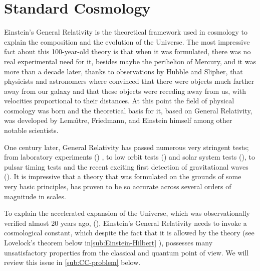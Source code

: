 
\chapter{Standard Cosmology \label{Overview}} %



\newcommand{\keyword}[1]{\textbf{#1}}
\newcommand{\tabhead}[1]{\textbf{#1}}
\newcommand{\code}[1]{\texttt{#1}}
\newcommand{\file}[1]{\texttt{\bfseries#1}}
\newcommand{\option}[1]{\texttt{\itshape#1}}

%

Einstein's General Relativity is the theoretical framework used in cosmology to explain the
composition and the evolution of the Universe.
The most impressive fact about this 100-year-old theory is that
when it was formulated, there was no real experimental need for it, besides maybe the
perihelion of Mercury, and it was more than a decade later, thanks to observations
by Hubble and Slipher, that physicists and astronomers where convinced that there were objects much farther away from
our galaxy and that these objects were receding away from us, with velocities proportional
to their distances. At this point the field of physical cosmology was born and the theoretical basis for it,
based on General Relativity, was developed by Lema\^{\i}tre, Friedmann, and Einstein himself among other
notable scientists.

One century later, General Relativity has passed numerous very stringent tests; from laboratory experiments (\cite{cite}) , to
low orbit tests (\cite{cite}) and solar system tests (\cite{cite}), to pulsar timing tests and the recent
exciting first detection of gravitational waves (\cite{cite}).
It is impressive that a theory that was formulated on the grounds of some very basic
principles, has proven to be so accurate across several orders of magnitude in scales.

To explain the accelerated expansion of the Universe, which was observationally verified almost 20 years ago,
(\cite{cite, supernova, 1998}), Einstein's General Relativity needs to invoke a cosmological constant, which despite the fact that
it is allowed by the theory (see Lovelock's theorem below in\cref{sub:Einstein-Hilbert} ),
possesses many unsatisfactory properties from the classical and quantum point of view. 
We will review this issue in \cref{sub:CC-problem} below.

